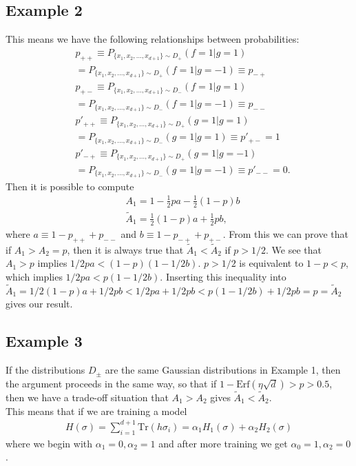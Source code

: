 \documentclass[onecolumn,prx, superscriptaddress,longbibliography,margin=1mm 11pt]{revtex4-2}
\begin{document}
\subsection*{Example 2} 
This means we have the following relationships between probabilities:
\begin{align}
    & p_{++} \equiv P_{\{x_1, x_2,...,x_{d+1}\}\sim D_+}  (f=1|g=1) \nonumber \\
    &=P_{\{x_1, x_2,...,x_{d+1}\}\sim D_+} (f=1|g=-1)\equiv p_{-+} \nonumber \\
    & p_{+-} \equiv P_{\{x_1, x_2,...,x_{d+1}\}\sim D_-}  (f=1|g=1)\nonumber \\
    &=P_{\{x_1, x_2,...,x_{d+1}\}\sim D_-} (f=1|g=-1) \equiv p_{--} \nonumber \\
    & p'_{++} \equiv P_{\{x_1, x_2,...,x_{d+1}\}\sim D_+}  (g=1|g=1) \nonumber \\
    &=P_{\{x_1, x_2,...,x_{d+1}\}\sim D_-} (g=1|g=1)\equiv p'_{+-}=1 \nonumber \\
     & p'_{-+} \equiv P_{\{x_1, x_2,...,x_{d+1}\}\sim D_+}  (g=1|g=-1)\nonumber \\
     &=P_{\{x_1, x_2,...,x_{d+1}\}\sim D_-} (g=1|g=-1)\equiv p'_{--}=0.
\end{align}
Then it is possible to compute
\begin{align}
    & A_1=1-\frac{1}{2}pa-\frac{1}{2}(1-p)b \nonumber \\
    & \tilde{A}_1=\frac{1}{2}(1-p)a+\frac{1}{2}pb,
\end{align}
where $a \equiv 1-p_{++}+p_{--}$ and $b \equiv 1-p_{-+}+p_{+-}$. From this we can prove that if $A_1>A_2=p$, then it is always true that $\tilde{A}_1<\tilde{A}_2$ if $p>1/2$. We see that $A_1>p$ implies $1/2pa<(1-p)(1-1/2b)$. $p>1/2$ is equivalent to $1-p<p$, which implies $1/2pa<p(1-1/2b)$. Inserting this inequality into $\tilde{A}_1=1/2(1-p)a+1/2pb<1/2pa+1/2pb<p(1-1/2b)+1/2pb=p=\tilde{A}_2$ gives our result. 
\subsection*{Example 3} 
If the distributions $D_{\pm}$ are the same Gaussian distributions in Example 1, then the argument proceeds in the same way, so that if $1-\text{Erf}(\eta \sqrt{d})>p>0.5$, then we have a trade-off situation that $A_1>A_2$ gives $\tilde{A}_1<\tilde{A}_2$. \\

This means that if we are training a model 
\begin{align}
     H(\sigma)=\sum_{i=1}^{d+1} \text{Tr}(h \sigma_i)=\alpha_1 H_1(\sigma)+\alpha_2 H_2(\sigma)
\end{align}
where we begin with $\alpha_1=0, \alpha_2=1$ and after more training we get $\alpha_0=1, \alpha_2=0$.
\end{document}

